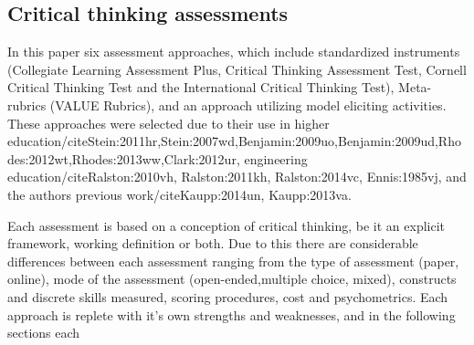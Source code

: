 \subsection{Critical thinking assessments}

In this paper six assessment approaches, which include standardized instruments (Collegiate Learning Assessment Plus, Critical Thinking Assessment Test, Cornell Critical Thinking Test and the International Critical Thinking Test), Meta-rubrics (VALUE Rubrics), and an approach utilizing model eliciting activities.  These approaches were selected due to their use in higher education/cite{Stein:2011hr,Stein:2007wd,Benjamin:2009uo,Benjamin:2009ud,Rhodes:2012wt,Rhodes:2013ww,Clark:2012ur}, engineering education/cite{Ralston:2010vh, Ralston:2011kh, Ralston:2014vc, Ennis:1985vj}, and the authors previous work/cite{Kaupp:2014un, Kaupp:2013va}.

Each assessment is based on a conception of critical thinking, be it an explicit framework, working definition or both.  Due to this there are considerable differences between each assessment ranging from the type of assessment (paper, online), mode of the assessment (open-ended,multiple choice, mixed), constructs and discrete skills measured, scoring procedures, cost and psychometrics.   Each approach is replete with it’s own strengths and weaknesses, and in the following sections each 
